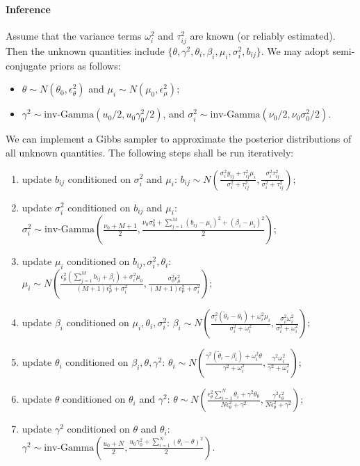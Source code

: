 \documentclass{article}
\begin{document}
\paragraph{Inference} Assume that the variance terms $\omega_i^2$ and $\tau_{ij}^2$ are known (or reliably estimated). Then the unknown quantities include $\{\theta, \gamma^2, \theta_i, \beta_i, \mu_i, \sigma_i^2, b_{ij}\}$. We may adopt semi-conjugate priors as follows:
\begin{itemize}
    \item $\theta \sim N(\theta_0, \epsilon_{\theta}^2)$ and $\mu_i \sim N(\mu_0, \epsilon_{\mu}^2)$;
    \item $\gamma^2 \sim \text{inv-Gamma}(u_0/2, u_0\gamma^2_0/2)$, and $\sigma_i^2 \sim \text{inv-Gamma}(\nu_0/2, \nu_0\sigma^2_0/2)$.
\end{itemize}

We can implement a Gibbs sampler to approximate the posterior distributions of all unknown quantities. The following steps shall be run iteratively:
\begin{enumerate}
    \item update $b_{ij}$ conditioned on $\sigma_i^2$ and $\mu_i$: $b_{ij} \sim N\left(\frac{\sigma_i^2y_{ij}+\tau_{ij}^2\mu_i}{\sigma_i^2+\tau_{ij}^2}, \frac{\sigma_i^2\tau_{ij}^2}{\sigma_i^2+\tau_{ij}^2}\right)$;
    \item update $\sigma_i^2$ conditioned on $b_{ij}$ and $\mu_i$: $\sigma_i^2 \sim \text{inv-Gamma}\left(\frac{\nu_0+M+1}{2}, \frac{\nu_0\sigma_0^2 + \sum_{j=1}^M(b_{ij}-\mu_i)^2+(\beta_i-\mu_i)^2}{2}\right)$;
    \item update $\mu_i$ conditioned on $b_{ij}, \sigma_i^2, \theta_i$: $\mu_i \sim N\left(\frac{\epsilon_{\mu}^2(\sum_{j=1}^M b_{ij}+\beta_i)+\sigma_i^2\mu_0}{(M+1)\epsilon_{\mu}^2 + \sigma_i^2},\frac{\sigma_0^2\epsilon_{\mu}^2}{(M+1)\epsilon_{\mu}^2 + \sigma_i^2}\right)$;
    \item update $\beta_i$ conditioned on $\mu_i, \theta_i, \sigma_i^2$: $\beta_i \sim N\left(\frac{\sigma_i^2(\tilde\theta_i - \theta_i)+\omega_i^2\mu_i}{\sigma_i^2+\omega_i^2}, \frac{\sigma_i^2\omega_i^2}{\sigma_i^2+\omega_i^2}\right)$;
    \item update $\theta_i$ conditioned on $\beta_i, \theta, \gamma^2$: $\theta_i \sim N\left(\frac{\gamma^2(\tilde\theta_i-\beta_i)+\omega_i^2\theta}{\gamma^2+\omega_i^2},\frac{\gamma^2\omega_i^2}{\gamma^2+\omega_i^2}\right)$;
    \item update $\theta$ conditioned on $\theta_i$ and $\gamma^2$: $\theta \sim N\left(\frac{\epsilon_{\theta}^2 \sum_{i=1}^N \theta_i + \gamma^2 \theta_0}{N\epsilon_{\theta}^2 + \gamma^2},\frac{\gamma^2 \epsilon_{\theta}^2}{N\epsilon_{\theta}^2 + \gamma^2}\right)$;
    \item update $\gamma^2$ conditioned on $\theta$ and $\theta_i$: $\gamma^2 \sim \text{inv-Gamma}\left(\frac{u_0+N}{2}, \frac{u_0\gamma_0^2 + \sum_{i=1}^N (\theta_i - \theta)^2}{2}\right)$.
\end{enumerate}
\end{document}
